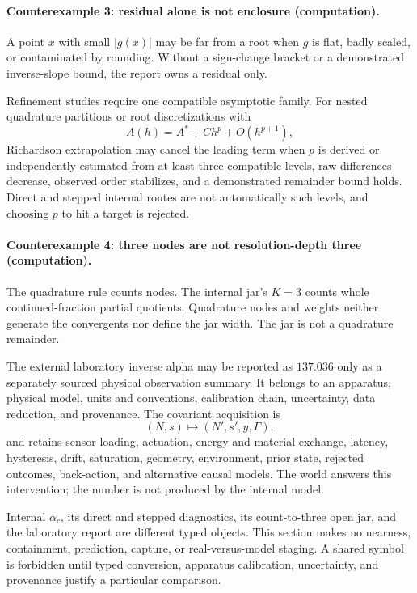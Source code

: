 \paragraph{Counterexample 3: residual alone is not enclosure (computation).}
A point \(x\) with small \(|g(x)|\) may be far from a root when \(g\) is flat, badly scaled, or contaminated by
rounding.  Without a sign-change bracket or a demonstrated inverse-slope bound, the report owns a residual only.

Refinement studies require one compatible asymptotic family.  For nested quadrature partitions or root discretizations
with
\[
                         A(h)=A^\ast+Ch^p+O(h^{p+1}),
\]
Richardson extrapolation may cancel the leading term when \(p\) is derived or independently estimated from at least
three compatible levels, raw differences decrease, observed order stabilizes, and a demonstrated remainder bound
holds.  Direct and stepped internal routes are not automatically such levels, and choosing \(p\) to hit a target is
rejected.

\paragraph{Counterexample 4: three nodes are not resolution-depth three (computation).}
The quadrature rule counts nodes.  The internal jar's \(K=3\) counts whole continued-fraction partial quotients.
Quadrature nodes and weights neither generate the convergents nor define the jar width.  The jar is not a quadrature
remainder.

The external laboratory inverse alpha may be reported as \(137.036\) only as a separately sourced physical
observation summary.  It belongs to an apparatus, physical model, units and conventions, calibration chain,
uncertainty, data reduction, and provenance.  The covariant acquisition is
\[
                         (N,s)\longmapsto(N',s',y,\Gamma),
\]
and retains sensor loading, actuation, energy and material exchange, latency, hysteresis, drift, saturation, geometry,
environment, prior state, rejected outcomes, back-action, and alternative causal models.  The world answers this
intervention; the number is not produced by the internal model.

Internal \(\alpha_c\), its direct and stepped diagnostics, its count-to-three open jar, and the laboratory report are
different typed objects.  This section makes no nearness, containment, prediction, capture, or real-versus-model
staging.  A shared symbol is forbidden until typed conversion, apparatus calibration, uncertainty, and provenance
justify a particular comparison.

